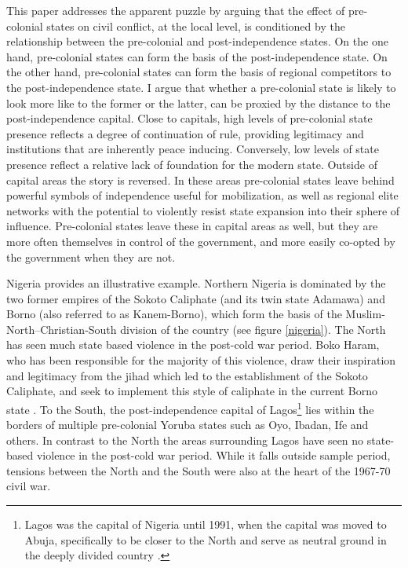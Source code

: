 \documentclass[12pt]{article}
\begin{document}
This paper addresses the apparent puzzle by arguing that the effect of
pre-colonial states on civil conflict, at the local level, is conditioned by the
relationship between the pre-colonial and post-independence states. On the one
hand, pre-colonial states can form the basis of the post-independence state. On
the other hand, pre-colonial states can form the basis of regional competitors
to the post-independence state. I argue that whether a pre-colonial state is
likely to look more like to the former or the latter, can be proxied by the
distance to the post-independence capital. Close to capitals, high levels of
pre-colonial state presence reflects a degree of continuation of rule, providing
legitimacy and institutions that are inherently peace inducing. Conversely, low
levels of state presence reflect a relative lack of foundation for the modern
state. Outside of capital areas the story is reversed. In these areas
pre-colonial states leave behind powerful symbols of independence useful for
mobilization, as well as regional elite networks with the potential to violently
resist state expansion into their sphere of influence. Pre-colonial states leave
these in capital areas as well, but they are more often themselves in control of
the government, and more easily co-opted by the government when they are not.

Nigeria provides an illustrative example. Northern Nigeria is dominated by the
two former empires of the Sokoto Caliphate (and its twin state Adamawa) and
Borno (also referred to as Kanem-Borno), which form the basis of the
Muslim-North--Christian-South division of the country (see figure
\ref{nigeria}). The North has seen much state based violence in the post-cold
war period. Boko Haram, who has been responsible for the majority of this
violence, draw their inspiration and legitimacy from the jihad which led to the
establishment of the Sokoto Caliphate, and seek to implement this style of
caliphate in the current Borno state \citep{Pieri2016}. To the South, the
post-independence capital of Lagos\footnote{Lagos was the capital of Nigeria
until 1991, when the capital was moved to Abuja, specifically to be closer to
the North and serve as neutral ground in the deeply divided country
\citep{Moore_1984}.} lies within the borders of multiple pre-colonial Yoruba
states such as Oyo, Ibadan, Ife and others. In contrast to the North the areas
surrounding Lagos have seen no state-based violence in the post-cold war period.
While it falls outside sample period, tensions between the North and the South
were also at the heart of the 1967-70 civil war.
\end{document}
